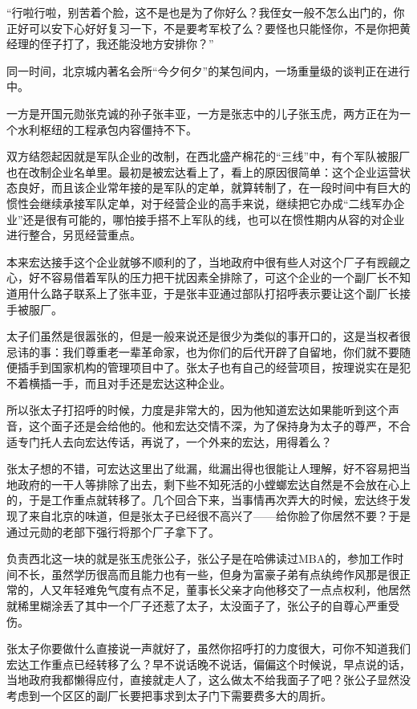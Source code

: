 “行啦行啦，别苦着个脸，这不是也是为了你好么？我侄女一般不怎么出门的，你正好可以安下心好好复习一下，不是要考军校了么？要怪也只能怪你，不是你把黄经理的侄子打了，我还能没地方安排你？”

同一时间，北京城内著名会所“今夕何夕”的某包间内，一场重量级的谈判正在进行中。

一方是开国元勋张克诚的孙子张丰亚，一方是张志中的儿子张玉虎，两方正在为一个水利枢纽的工程承包内容僵持不下。

双方结怨起因就是军队企业的改制，在西北盛产棉花的“三线”中，有个军队被服厂也在改制企业名单里。最初是被宏达看上了，看上的原因很简单：这个企业运营状态良好，而且该企业常年接的是军队的定单，就算转制了，在一段时间中有巨大的惯性会继续承接军队定单，对于经营企业的高手来说，继续把它办成“二线军办企业”还是很有可能的，哪怕接手搭不上军队的线，也可以在惯性期内从容的对企业进行整合，另觅经营重点。

本来宏达接手这个企业就够不顺利的了，当地政府中很有些人对这个厂子有觊觎之心，好不容易借着军队的压力把干扰因素全排除了，可这个企业的一个副厂长不知道用什么路子联系上了张丰亚，于是张丰亚通过部队打招呼表示要让这个副厂长接手被服厂。

太子们虽然是很嚣张的，但是一般来说还是很少为类似的事开口的，这是当权者很忌讳的事：我们尊重老一辈革命家，也为你们的后代开辟了自留地，你们就不要随便插手到国家机构的管理项目中了。张太子也有自己的经营项目，按理说实在是犯不着横插一手，而且对手还是宏达这种企业。

所以张太子打招呼的时候，力度是非常大的，因为他知道宏达如果能听到这个声音，这个面子还是会给他的。他和宏达交情不深，为了保持身为太子的尊严，不合适专门托人去向宏达传话，再说了，一个外来的宏达，用得着么？

张太子想的不错，可宏达这里出了纰漏，纰漏出得也很能让人理解，好不容易把当地政府的一干人等排除了出去，剩下些不知死活的小螳螂宏达自然是不会放在心上的，于是工作重点就转移了。几个回合下来，当事情再次弄大的时候，宏达终于发现了来自北京的味道，但是张太子已经很不高兴了——给你脸了你居然不要？于是通过元勋的老部下强行将那个厂子拿下了。

负责西北这一块的就是张玉虎张公子，张公子是在哈佛读过MBA的，参加工作时间不长，虽然学历很高而且能力也有一些，但身为富豪子弟有点纨绔作风那是很正常的，人又年轻难免气度有点不足，董事长父亲才向他移交了一点点权利，他居然就稀里糊涂丢了其中一个厂子还惹了太子，太没面子了，张公子的自尊心严重受伤。

张太子你要做什么直接说一声就好了，虽然你招呼打的力度很大，可你不知道我们宏达工作重点已经转移了么？早不说话晚不说话，偏偏这个时候说，早点说的话，当地政府我都懒得应付，直接就走人了，这么做太不给我面子了吧？张公子显然没考虑到一个区区的副厂长要把事求到太子门下需要费多大的周折。

